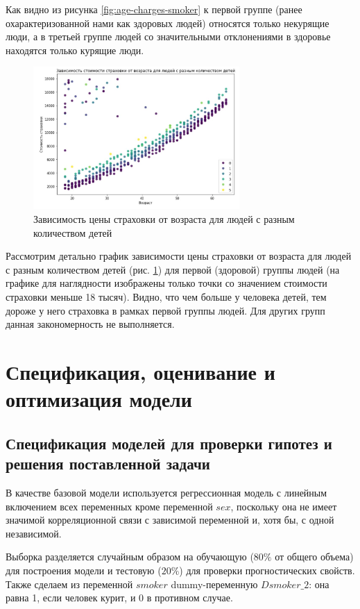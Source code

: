 \documentclass[a4paper,12pt]{article}
\begin{document}
Как видно из рисунка \ref{fig:age-charges-smoker} к первой группе (ранее охарактеризованной нами как здоровых людей) относятся только некурящие люди, а в третьей группе людей со значительными отклонениями в здоровье находятся только курящие люди.

\begin{figure}[H]
	\includegraphics[width=0.7\textwidth]{../[graphics]/age-charges-childern.jpg}
	\centering
	\caption{Зависимость цены страховки от возраста для людей с разным количеством детей}
	\label{fig:age-charges-children}
\end{figure}

Рассмотрим детально график зависимости цены страховки от возраста для людей с разным количеством детей (рис. \ref{fig:age-charges-children}) для первой (здоровой) группы людей (на графике для наглядности изображены только точки со значением стоимости страховки меньше 18 тысяч). Видно, что чем больше у человека детей, тем дороже у него страховка в рамках первой группы людей. Для других групп данная закономерность не выполняется.

\section{Спецификация, оценивание и оптимизация модели}

\subsection{Спецификация моделей для проверки гипотез и решения поставленной задачи}

В качестве базовой модели используется регрессионная модель с линейным включением всех переменных кроме переменной $sex$, поскольку она не имеет значимой корреляционной связи с зависимой переменной и, хотя бы, с одной независимой. 

Выборка разделяется случайным образом на обучающую ($80\%$ от общего объема) для построения модели и тестовую ($20\%$) для проверки прогностических свойств. Также сделаем из переменной $smoker$ dummy-переменную $Dsmoker\_2$: она равна 1, если человек курит, и 0 в противном случае.
\end{document}
